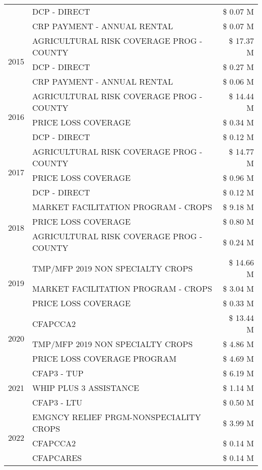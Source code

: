 \begin{tabular}{llr}
 & DCP - DIRECT & \$ 0.07 M \\
 & CRP PAYMENT - ANNUAL RENTAL & \$ 0.07 M \\
\cline{1-3}
\multirow[t]{3}{*}{2015} & AGRICULTURAL RISK COVERAGE PROG - COUNTY & \$ 17.37 M \\
 & DCP - DIRECT & \$ 0.27 M \\
 & CRP PAYMENT - ANNUAL RENTAL & \$ 0.06 M \\
\cline{1-3}
\multirow[t]{3}{*}{2016} & AGRICULTURAL RISK COVERAGE PROG - COUNTY & \$ 14.44 M \\
 & PRICE LOSS COVERAGE & \$ 0.34 M \\
 & DCP - DIRECT & \$ 0.12 M \\
\cline{1-3}
\multirow[t]{3}{*}{2017} & AGRICULTURAL RISK COVERAGE PROG - COUNTY & \$ 14.77 M \\
 & PRICE LOSS COVERAGE & \$ 0.96 M \\
 & DCP - DIRECT & \$ 0.12 M \\
\cline{1-3}
\multirow[t]{3}{*}{2018} & MARKET FACILITATION PROGRAM - CROPS & \$ 9.18 M \\
 & PRICE LOSS COVERAGE & \$ 0.80 M \\
 & AGRICULTURAL RISK COVERAGE PROG - COUNTY & \$ 0.24 M \\
\cline{1-3}
\multirow[t]{3}{*}{2019} & TMP/MFP 2019 NON SPECIALTY CROPS & \$ 14.66 M \\
 & MARKET FACILITATION PROGRAM - CROPS & \$ 3.04 M \\
 & PRICE LOSS COVERAGE & \$ 0.33 M \\
\cline{1-3}
\multirow[t]{3}{*}{2020} & CFAPCCA2 & \$ 13.44 M \\
 & TMP/MFP 2019 NON SPECIALTY CROPS & \$ 4.86 M \\
 & PRICE LOSS COVERAGE PROGRAM & \$ 4.69 M \\
\cline{1-3}
\multirow[t]{3}{*}{2021} & CFAP3 - TUP & \$ 6.19 M \\
 & WHIP PLUS 3 ASSISTANCE & \$ 1.14 M \\
 & CFAP3 - LTU & \$ 0.50 M \\
\cline{1-3}
\multirow[t]{3}{*}{2022} & EMGNCY RELIEF PRGM-NONSPECIALITY CROPS & \$ 3.99 M \\
 & CFAPCCA2 & \$ 0.14 M \\
 & CFAPCARES & \$ 0.14 M \\
\cline{1-3}
\bottomrule
\end{tabular}
